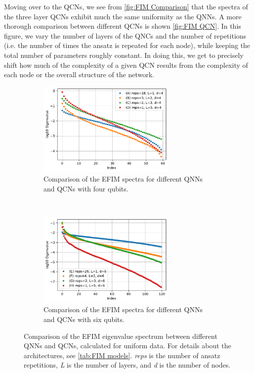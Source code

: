 Moving over to the QCNs, we see from \autoref{fig:FIM Comparison} that the spectra of the three layer QCNs exhibit much the same uniformity as the QNNs. A more thorough comparison between different QCNs is shown \autoref{fig:FIM QCN}. In this figure, we vary the number of layers of the QNCs and the number of repetitions (i.e. the number of times the ansatz is repeated for each node), while keeping the total number of parameters roughly constant. In doing this, we get to precisely shift how much of the complexity of a given QCN results from the complexity of each node or the overall structure of the network.

\begin{figure}[H]
    \centering
    \begin{subfigure}[t]{0.45\textwidth}
        \centering
        \includegraphics[height=1.8in]{latex/figures/FIM_qubits_4_comparison.pdf}
        \caption{Comparison of the EFIM spectra for different QNNs and QCNs with four qubits.}
        \label{fig:FIM QCN a}
    \end{subfigure}%
    ~ 
    \begin{subfigure}[t]{0.45\textwidth}
        \centering
        \includegraphics[height=1.8in]{latex/figures/FIM_qubits_6_comparison.pdf}
        \caption{Comparison of the EFIM spectra for different QNNs and QCNs with six qubits.}
        \label{fig:FIM QCN b}
    \end{subfigure}
    \caption{Comparison of the EFIM eigenvalue spectrum between different QNNs and QCNs, calculated for uniform data. For details about the architectures, see \autoref{tab:FIM models}. \emph{reps} is the number of ansatz repetitions, \emph{L} is the number of layers, and \emph{d} is the number of nodes.}
    \label{fig:FIM QCN}
\end{figure}

